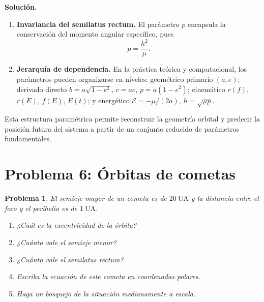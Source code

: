 \documentclass[11pt]{article}
\theoremstyle{prismstyle}
\newtheorem{problem}{Problema}
\newenvironment{solution}[1][Solución]
  {\par\textbf{#1.}\ }
  {\par}
\newcommand{\problemsection}[2]{
  \section{#1}
  \begin{problem}
  #2
  \end{problem}
}
\begin{document}
\begin{solution}
\begin{enumerate}
  \item \textbf{Invariancia del semilatus rectum.} El parámetro $p$ encapsula la conservación del momento angular específico, pues
  \[
  p = \frac{h^2}{\mu}.
  \]

  \item \textbf{Jerarquía de dependencia.} En la práctica teórica y computacional, los parámetros pueden organizarse en niveles: geométrico primario $(a,e)$; derivado directo $b = a\sqrt{1-e^2}$, $c = ae$, $p = a(1-e^2)$; cinemático $r(f)$, $r(E)$, $f(E)$, $E(t)$; y energético $\mathcal{E} = -\mu/(2a)$, $h = \sqrt{\mu p}$.
\end{enumerate}

Esta estructura paramétrica permite reconstruir la geometría orbital y predecir la posición futura del sistema a partir de un conjunto reducido de parámetros fundamentales.
\end{solution}

\problemsection{Problema 6: Órbitas de cometas}{
El semieje mayor de un cometa es de $20\ \text{UA}$ y la distancia entre el foco y el perihelio es de $1\ \text{UA}$.
\begin{enumerate}[label=\alph*)]
  \item ¿Cuál es la excentricidad de la órbita?
  \item ¿Cuánto vale el semieje menor?
  \item ¿Cuánto vale el semilatus rectum?
  \item Escriba la ecuación de este cometa en coordenadas polares.
  \item Haga un bosquejo de la situación medianamente a escala.
\end{enumerate}
}
\end{document}
